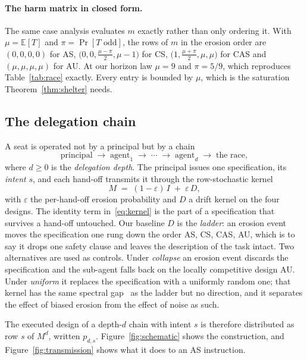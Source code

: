 \documentclass[11pt,a4paper]{article}
\theoremstyle{definition}
\newcommand{\AS}{\textsf{AS}}
\newcommand{\CS}{\textsf{CS}}
\newcommand{\CAS}{\textsf{CAS}}
\newcommand{\AU}{\textsf{AU}}
\begin{document}
\paragraph{The harm matrix in closed form.}
The same case analysis evaluates $m$ exactly rather than only ordering it.
With $\mu=\mathbb{E}[T]$ and $\pi=\Pr[T\text{ odd}]$, the rows of $m$ in the
erosion order are $(0,0,0,0)$ for \AS{},
$\bigl(0,0,\tfrac{\mu-\pi}{2},\mu-1\bigr)$ for \CS{},
$\bigl(1,\tfrac{\mu+\pi}{2},\mu,\mu\bigr)$ for \CAS{} and $(\mu,\mu,\mu,\mu)$
for \AU{}. At our horizon law $\mu=9$ and $\pi=5/9$, which reproduces
Table~\ref{tab:race} exactly. Every entry is bounded by $\mu$, which is the
saturation Theorem~\ref{thm:shelter} needs.

\subsection{The delegation chain}

A seat is operated not by a principal but by a chain
\[
  \text{principal} \;\longrightarrow\; \text{agent}_1 \;\longrightarrow\;
  \cdots \;\longrightarrow\; \text{agent}_d \;\longrightarrow\; \text{the race},
\]
where $d\ge 0$ is the \emph{delegation depth}. The principal issues one
specification, its \emph{intent} $s$, and each hand-off transmits it through
the row-stochastic kernel
\begin{equation}
  M \;=\; (1-\varepsilon)\,I \;+\; \varepsilon\,D ,
  \label{eq:kernel}
\end{equation}
with $\varepsilon$ the per-hand-off erosion probability and $D$ a drift kernel
on the four designs. The identity term in~\eqref{eq:kernel} is the part of a
specification that survives a hand-off untouched. Our baseline $D$ is the \emph{ladder}: an erosion event
moves the specification one rung down the order \AS{}, \CS{}, \CAS{}, \AU{},
which is to say it drops one safety clause and leaves the description of the
task intact. Two alternatives are used as controls. Under \emph{collapse} an
erosion event discards the specification and the sub-agent falls back on the
locally competitive design \AU{}. Under \emph{uniform} it replaces the
specification with a uniformly random one; that kernel has the same spectral
gap~\citep{levin2017markov} as the ladder but no direction, and it separates the effect of biased
erosion from the effect of noise as such.

The executed design of a depth-$d$ chain with intent $s$ is therefore
distributed as row $s$ of $M^{d}$, written $p_{d,s}$. Figure~\ref{fig:schematic}
shows the construction, and Figure~\ref{fig:transmission} shows what it does
to an \AS{} instruction.
\end{document}
